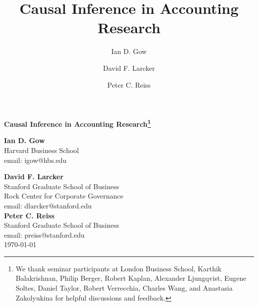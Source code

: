 \documentclass[12pt,reqno,titlepage]{amsart}
\title[Causal Inference in Accounting]{Causal Inference in Accounting Research}
\author{Ian D. Gow}
\author{David F. Larcker}
\author{Peter C. Reiss}
\begin{document}
\usetikzlibrary{automata, shapes, calc, positioning}



\begin{titlepage}
  \centering
  	\begin{large}
  	\textbf{Causal Inference in Accounting Research\footnote{We thank seminar participants at London Business School, Karthik Balakrishnan, Philip Berger, Robert Kaplan, Alexander Ljungqvist, Eugene Soltes, Daniel Taylor, Robert Verrecchia, Charles Wang, and Anastasia Zakolyukina for helpful discussions and feedback.}} \\	
  	\end{large}
  	\vspace{60pt}
	\textbf{Ian D. Gow} \\
	Harvard Business School \\
	email: igow@hbs.edu

  	\vspace{30pt}
	\textbf{David F. Larcker} \\
	Stanford Graduate School of Business \\
	Rock Center for Corporate Governance \\
	email: dlarcker@stanford.edu \\
		
	\vspace{30pt}
	\textbf{Peter C. Reiss} \\
	Stanford Graduate School of Business \\
	email: preiss@stanford.edu \\

	\vspace{30pt}
	\today
	

	

\end{titlepage}
\end{document}
